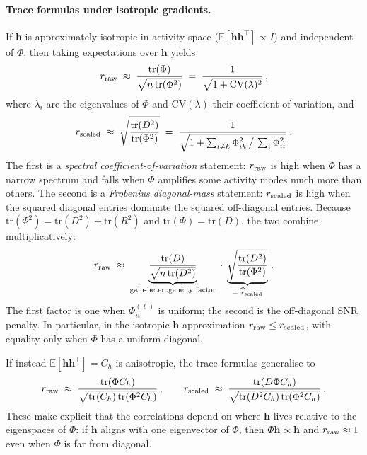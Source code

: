 \documentclass[10pt]{article}
\newcommand{\vh}{\mathbf{h}}
\begin{document}
\paragraph{Trace formulas under isotropic gradients.}
If $\vh$ is approximately isotropic in activity space ($\mathbb{E}[\vh\vh^{\!\top}]\propto I$) and independent of $\Phi$, then taking expectations over $\vh$ yields
\begin{equation}\label{eq:rraw-trace}
  r_{\rm raw}
  \;\approx\;
  \frac{\mathrm{tr}(\Phi)}{\sqrt{n\,\mathrm{tr}(\Phi^2)}}
  \;=\;
  \frac{1}{\sqrt{1+\mathrm{CV}(\lambda)^2}}\,,
\end{equation}
where $\lambda_i$ are the eigenvalues of $\Phi$ and $\mathrm{CV}(\lambda)$ their coefficient of variation, and
\begin{equation}\label{eq:rscaled-trace}
  r_{\rm scaled}
  \;\approx\;
  \sqrt{\frac{\mathrm{tr}(D^2)}{\mathrm{tr}(\Phi^2)}}
  \;=\;
  \frac{1}{\sqrt{1+\sum_{i\neq k}\Phi_{ik}^2\,\big/\,\sum_i\Phi_{ii}^2}}\,.
\end{equation}
The first is a \emph{spectral coefficient-of-variation} statement: $r_{\rm raw}$ is high when $\Phi$ has a narrow spectrum and falls when $\Phi$ amplifies some activity modes much more than others.  The second is a \emph{Frobenius diagonal-mass} statement: $r_{\rm scaled}$ is high when the squared diagonal entries dominate the squared off-diagonal entries.  Because $\mathrm{tr}(\Phi^2)=\mathrm{tr}(D^2)+\mathrm{tr}(R^2)$ and $\mathrm{tr}(\Phi)=\mathrm{tr}(D)$, the two combine multiplicatively:
\begin{equation}\label{eq:r-raw-snr}
  r_{\rm raw}
  \;\approx\;
  \underbrace{\frac{\mathrm{tr}(D)}{\sqrt{n\,\mathrm{tr}(D^2)}}}_{\text{gain-heterogeneity factor}}
  \;\cdot\;
  \underbrace{\sqrt{\frac{\mathrm{tr}(D^2)}{\mathrm{tr}(\Phi^2)}}}_{=\;\widehat r_{\rm scaled}}\,.
\end{equation}
The first factor is one when $\Phi^{(\ell)}_{ii}$ is uniform; the second is the off-diagonal SNR penalty.  In particular, in the isotropic-$\vh$ approximation $r_{\rm raw}\le r_{\rm scaled}$, with equality only when $\Phi$ has a uniform diagonal.

If instead $\mathbb{E}[\vh\vh^{\!\top}]=C_h$ is anisotropic, the trace formulas generalise to
\begin{equation}\label{eq:trace-Ch}
  r_{\rm raw}
  \;\approx\;
  \frac{\mathrm{tr}(\Phi C_h)}{\sqrt{\mathrm{tr}(C_h)\,\mathrm{tr}(\Phi^2 C_h)}}\,,
  \qquad
  r_{\rm scaled}
  \;\approx\;
  \frac{\mathrm{tr}(D\Phi C_h)}{\sqrt{\mathrm{tr}(D^2 C_h)\,\mathrm{tr}(\Phi^2 C_h)}}\,.
\end{equation}
These make explicit that the correlations depend on where $\vh$ lives relative to the eigenspaces of $\Phi$: if $\vh$ aligns with one eigenvector of $\Phi$, then $\Phi\vh\propto\vh$ and $r_{\rm raw}\approx 1$ even when $\Phi$ is far from diagonal.
\end{document}
